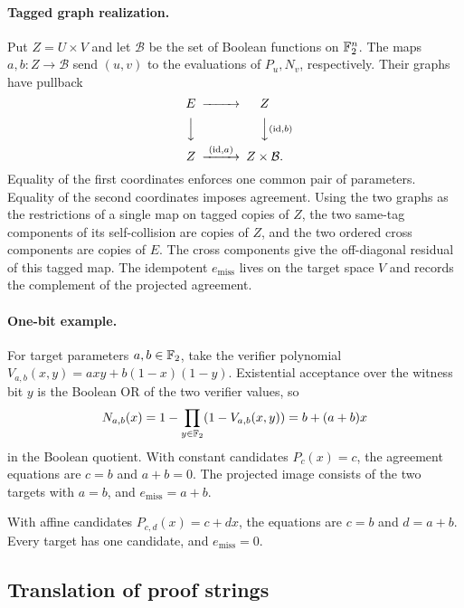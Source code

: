 \paragraph{Tagged graph realization.}
Put \(Z=U\times V\) and let \(\mathcal B\) be the set of Boolean functions
on \(\mathbb F_2^n\). The maps \(a,b\colon Z\to\mathcal B\) send
\((u,v)\) to the evaluations of \(P_u,N_v\), respectively. Their graphs
have pullback
\begin{equation}\label{eq:agreement-graphs}
\begin{CD}
 E @>>> Z \\
 @VVV @VV{(\mathrm{id},b)}V \\
 Z @>{(\mathrm{id},a)}>> Z\times\mathcal B .
\end{CD}
\end{equation}
Equality of the first coordinates enforces one common pair of
parameters. Equality of the second coordinates imposes agreement.
Using the two graphs as the restrictions of a single map on tagged
copies of \(Z\), the two same-tag components of its self-collision are
copies of \(Z\), and the two ordered cross components are copies of
\(E\). The cross components give the off-diagonal residual of this
tagged map. The idempotent \(e_{\mathrm{miss}}\) lives on the target
space \(V\) and records the complement of the projected agreement.

\paragraph{One-bit example.}
For target parameters \(a,b\in\mathbb F_2\), take the verifier polynomial
\(V_{a,b}(x,y)=axy+b(1-x)(1-y)\). Existential acceptance over the witness
bit \(y\) is the Boolean OR of the two verifier values, so
\[
 N_{a,b}(x)
   =1-\prod_{y\in\mathbb F_2}(1-V_{a,b}(x,y))
   =b+(a+b)x
\]
in the Boolean quotient. With constant candidates \(P_c(x)=c\), the
agreement equations are \(c=b\) and \(a+b=0\). The projected image
consists of the two targets with \(a=b\), and \(e_{\mathrm{miss}}=a+b\).

With affine candidates \(P_{c,d}(x)=c+dx\), the equations are \(c=b\)
and \(d=a+b\). Every target has one candidate, and
\(e_{\mathrm{miss}}=0\).

\subsection{Translation of proof strings}

